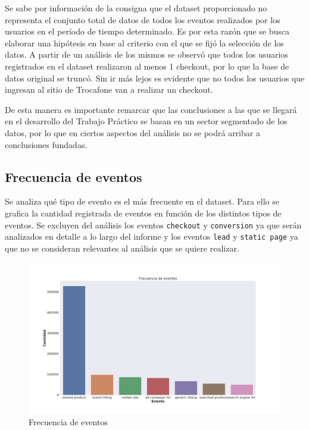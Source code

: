\documentclass[a4paper]{article}
\begin{document}
Se sabe por información de la consigna que el dataset proporcionado no representa el conjunto total de datos de todos los eventos realizados por los usuarios en el período de tiempo determinado. Es por esta razón que se busca elaborar una hipótesis en base al criterio con el que se fijó la selección de los datos. A partir de un análisis de los mismos se observó que todos los usuarios registrados en el dataset realizaron al menos 1 checkout, por lo que la base de datos original se truncó. Sin ir más lejos es evidente que no todos los usuarios que ingresan al sitio de Trocafone van a realizar un checkout.

De esta manera es importante remarcar que las conclusiones a las que se llegará en el desarrollo del Trabajo Práctico se basan en un sector segmentado de los datos, por lo que en ciertos aspectos del análisis no se podrá arribar a conclusiones fundadas.

\subsection{Frecuencia de eventos}

Se analiza qué tipo de evento es el más frecuente en el dataset. Para ello se grafica la cantidad registrada de eventos en función de los distintos tipos de eventos. Se excluyen del análisis los eventos \texttt{checkout} y \texttt{conversion} ya que serán analizados en detalle a lo largo del informe y los eventos \texttt{lead} y \texttt{static page} ya que no se consideran relevantes al análisis que se quiere realizar.

\begin{figure}[h!]
	\includegraphics[width=\textwidth]{figures/02-eventos-barplot.png}
	\caption{Frecuencia de eventos}
	\label{fig:freqeventos}
\end{figure}
\end{document}
